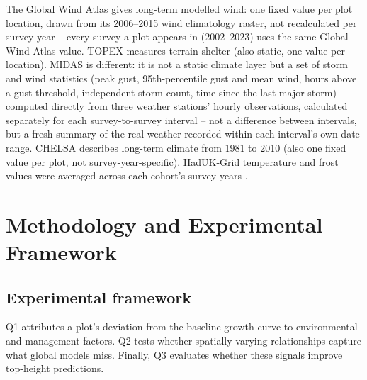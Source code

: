 \documentclass[logo,msc,ai]{infthesis}           %
\begin{document}
The Global Wind Atlas gives long-term modelled wind: one fixed value per plot location, drawn from its 2006--2015 wind climatology raster, not recalculated per survey year -- every survey a plot appears in (2002--2023) uses the same Global Wind Atlas value. TOPEX measures terrain shelter (also static, one value per location). MIDAS is different: it is not a static climate layer but a set of storm and wind statistics (peak gust, 95th-percentile gust and mean wind, hours above a gust threshold, independent storm count, time since the last major storm) computed directly from three weather stations' hourly observations, calculated separately for each survey-to-survey interval -- not a difference between intervals, but a fresh summary of the real weather recorded within each interval's own date range. CHELSA describes long-term climate from 1981 to 2010 \cite{karger2017CHELSA_C3_LID} (also one fixed value per plot, not survey-year-specific). HadUK-Grid temperature and frost values were averaged across each cohort's survey years \cite{hollis2019HadUKGrid_C3_LID}. %


\chapter{Methodology and Experimental Framework} \label{ch:methodology}
\section{Experimental framework}
Q1 attributes a plot's deviation from the baseline growth curve to environmental and management factors. Q2 tests whether spatially varying relationships capture what global models miss. Finally, Q3 evaluates whether these signals improve top-height predictions.
\end{document}
